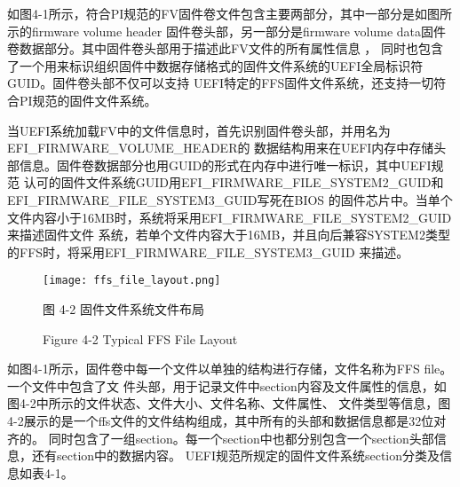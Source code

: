 如图4-1所示，符合PI规范的FV固件卷文件包含主要两部分，其中一部分是如图所示的firmware volume header
固件卷头部，另一部分是firmware volume data固件卷数据部分。其中固件卷头部用于描述此FV文件的所有属性信息
\cite{extra2}，
同时也包含了一个用来标识组织固件中数据存储格式的固件文件系统的UEFI全局标识符GUID。固件卷头部不仅可以支持
UEFI特定的FFS固件文件系统，还支持一切符合PI规范的固件文件系统。
\par 当UEFI系统加载FV中的文件信息时，首先识别固件卷头部，并用名为EFI\_FIRMWARE\_VOLUME\_HEADER的
数据结构用来在UEFI内存中存储头部信息。固件卷数据部分也用GUID的形式在内存中进行唯一标识，其中UEFI规范
认可的固件文件系统GUID用EFI\_FIRMWARE\_FILE\_SYSTEM2\_GUID和EFI\_FIRMWARE\_FILE\_SYSTEM3\_GUID写死在BIOS
的固件芯片中。当单个文件内容小于16MB时，系统将采用EFI\_FIRMWARE\_FILE\_SYSTEM2\_GUID来描述固件文件
系统，若单个文件内容大于16MB，并且向后兼容SYSTEM2类型的FFS时，将采用EFI\_FIRMWARE\_FILE\_SYSTEM3\_GUID
来描述。

\begin{figure}[htb]
    \vspace{0cm}   
    \setlength{\abovecaptionskip}{0.3cm}
	\centering
    \texttt{[image: ffs\_file\_layout.png]}
    \caption*{图 4-2 固件文件系统文件布局}
    \setlength{\belowcaptionskip}{-0.7cm}
    \caption*{Figure 4-2 Typical FFS File Layout}
\end{figure}

\par 如图4-1所示，固件卷中每一个文件以单独的结构进行存储，文件名称为FFS file。一个文件中包含了文
件头部，用于记录文件中section内容及文件属性的信息，如图4-2中所示的文件状态、文件大小、文件名称、文件属性、
文件类型等信息，图4-2展示的是一个ffs文件的文件结构组成，其中所有的头部和数据信息都是32位对齐的。
同时包含了一组section。每一个section中也都分别包含一个section头部信息，还有section中的数据内容。
UEFI规范所规定的固件文件系统section分类及信息如表4-1。

